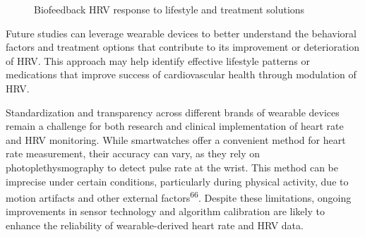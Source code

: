 \documentclass[
  a4paper,
  headsepline=true,
  open=any]{scrbook}
\begin{document}
\begin{figure}

\begin{minipage}[t]{\linewidth}

{\centering 


\caption{Biofeedback HRV response to lifestyle and treatment solutions}

}

\end{minipage}%

\end{figure}

Future studies can leverage wearable devices to better understand the
behavioral factors and treatment options that contribute to its
improvement or deterioration of HRV. This approach may help identify
effective lifestyle patterns or medications that improve success of
cardiovascular health through modulation of HRV.

Standardization and transparency across different brands of wearable
devices remain a challenge for both research and clinical implementation
of heart rate and HRV monitoring. While smartwatches offer a convenient
method for heart rate measurement, their accuracy can vary, as they rely
on photoplethysmography to detect pulse rate at the wrist. This method
can be imprecise under certain conditions, particularly during physical
activity, due to motion artifacts and other external
factors\textsuperscript{66}. Despite these limitations, ongoing
improvements in sensor technology and algorithm calibration are likely
to enhance the reliability of wearable-derived heart rate and HRV data.
\end{document}
